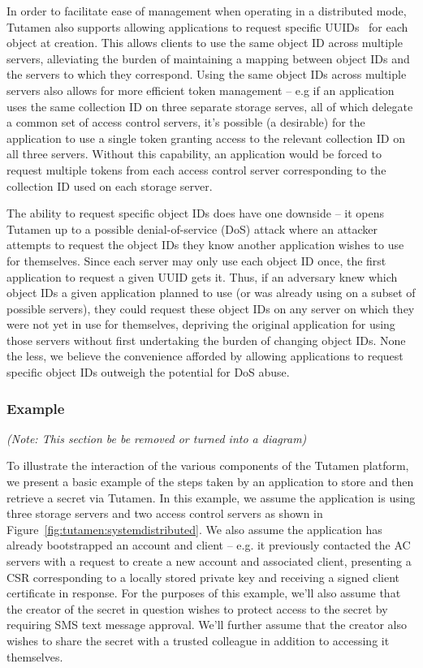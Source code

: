 In order to facilitate ease of management when operating in a
distributed mode, Tutamen also supports allowing applications to
request specific UUIDs~\cite{leach2005} for each object at creation.
This allows clients to use the same object ID across multiple servers,
alleviating the burden of maintaining a mapping between object IDs and
the servers to which they correspond. Using the same object IDs across
multiple servers also allows for more efficient token management --
e.g if an application uses the same collection ID on three separate
storage serves, all of which delegate a common set of access control
servers, it's possible (a desirable) for the application to use a
single token granting access to the relevant collection ID on all
three servers. Without this capability, an application would be forced
to request multiple tokens from each access control server
corresponding to the collection ID used on each storage server.

The ability to request specific object IDs does have one downside --
it opens Tutamen up to a possible denial-of-service (DoS) attack where
an attacker attempts to request the object IDs they know another
application wishes to use for themselves. Since each server may only
use each object ID once, the first application to request a given UUID
gets it. Thus, if an adversary knew which object IDs a given
application planned to use (or was already using on a subset of
possible servers), they could request these object IDs on any server
on which they were not yet in use for themselves, depriving the
original application for using those servers without first undertaking
the burden of changing object IDs. None the less, we believe the
convenience afforded by allowing applications to request specific
object IDs outweigh the potential for DoS abuse.

\subsubsection{Example}

{\em(Note: This section be be removed or turned into a diagram)}

To illustrate the interaction of the various components of the Tutamen
platform, we present a basic example of the steps taken by an
application to store and then retrieve a secret via Tutamen. In this
example, we assume the application is using three storage servers and
two access control servers as shown in
Figure~\ref{fig:tutamen:systemdistributed}. We also assume the
application has already bootstrapped an account and client -- e.g. it
previously contacted the AC servers with a request to create a new
account and associated client, presenting a CSR corresponding to a
locally stored private key and receiving a signed client certificate
in response. For the purposes of this example, we'll also assume that
the creator of the secret in question wishes to protect access to the
secret by requiring SMS text message approval. We'll further assume
that the creator also wishes to share the secret with a trusted
colleague in addition to accessing it themselves.

